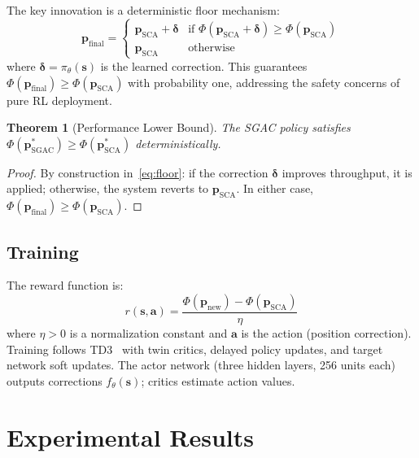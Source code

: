 \documentclass[journal]{IEEEtran}
\newtheorem{theorem}{Theorem}
\begin{document}
The key innovation is a deterministic floor mechanism:
\begin{equation}
\mathbf{p}_{\text{final}} = \begin{cases}
\mathbf{p}_{\text{SCA}} + \boldsymbol{\delta} & \text{if } \Phi(\mathbf{p}_{\text{SCA}} + \boldsymbol{\delta}) \geq \Phi(\mathbf{p}_{\text{SCA}}) \\
\mathbf{p}_{\text{SCA}} & \text{otherwise}
\end{cases}
\label{eq:floor}
\end{equation}
where $\boldsymbol{\delta} = \pi_\theta(\mathbf{s})$ is the learned correction. This guarantees $\Phi(\mathbf{p}_{\text{final}}) \geq \Phi(\mathbf{p}_{\text{SCA}})$ with probability one, addressing the safety concerns of pure RL deployment.

\begin{theorem}[Performance Lower Bound]
\label{thm:floor}
The SGAC policy satisfies $\Phi(\mathbf{p}^*_{\text{SGAC}}) \geq \Phi(\mathbf{p}^*_{\text{SCA}})$ deterministically.
\end{theorem}

\begin{proof}
By construction in~\eqref{eq:floor}: if the correction $\boldsymbol{\delta}$ improves throughput, it is applied; otherwise, the system reverts to $\mathbf{p}_{\text{SCA}}$. In either case, $\Phi(\mathbf{p}_{\text{final}}) \geq \Phi(\mathbf{p}_{\text{SCA}})$.
\end{proof}

\subsection{Training}

The reward function is:
\begin{equation}
r(\mathbf{s}, \mathbf{a}) = \frac{\Phi(\mathbf{p}_{\text{new}}) - \Phi(\mathbf{p}_{\text{SCA}})}{\eta}
\label{eq:reward}
\end{equation}
where $\eta > 0$ is a normalization constant and $\mathbf{a}$ is the action (position correction). Training follows TD3~\cite{fujimoto2018} with twin critics, delayed policy updates, and target network soft updates. The actor network (three hidden layers, 256 units each) outputs corrections $f_\theta(\mathbf{s})$; critics estimate action values.

\section{Experimental Results}
\end{document}
